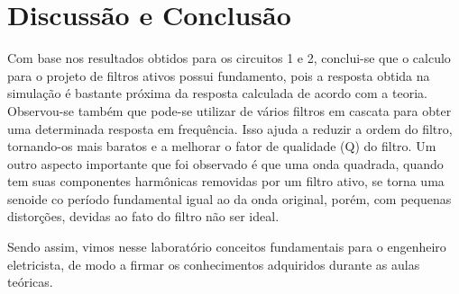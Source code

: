 \newpage
\section{Discussão e Conclusão}
Com base nos resultados obtidos para os circuitos 1 e 2, conclui-se que o calculo para o projeto de filtros ativos possui fundamento, pois a resposta obtida na simulação é bastante próxima da resposta calculada de acordo com a teoria.
Observou-se também que pode-se utilizar de vários filtros em cascata para obter uma determinada resposta em frequência. Isso ajuda a reduzir a ordem do filtro, tornando-os mais baratos e a melhorar o fator de qualidade (Q) do filtro. Um outro aspecto importante que foi observado é que uma onda quadrada, quando tem suas componentes harmônicas removidas por um filtro ativo, se torna uma senoide co período fundamental igual ao da onda original, porém, com pequenas distorções, devidas ao fato do filtro não ser ideal.

Sendo assim, vimos nesse laboratório conceitos fundamentais para o engenheiro eletricista, de modo a firmar os conhecimentos adquiridos durante as aulas teóricas.